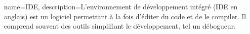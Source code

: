 {
	name=IDE,
	description={L'environnement de développement intégré (IDE en anglais) est un logiciel permettant à la fois d'éditer du code et de le compiler. Il comprend souvent des outils simplifiant le développement, tel un débogueur.}
}

